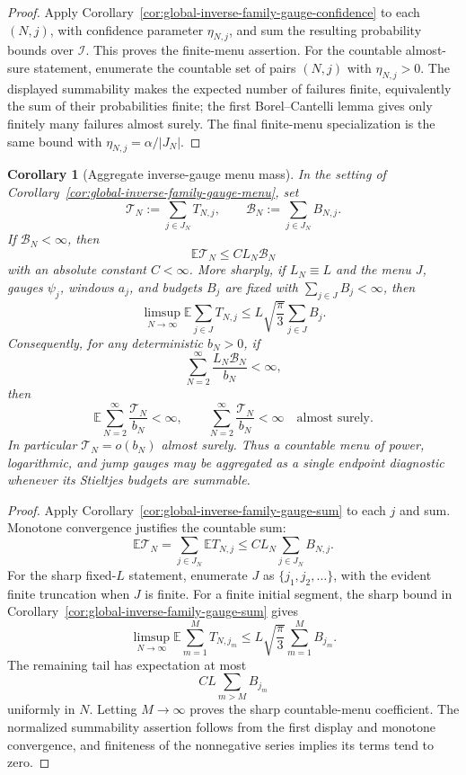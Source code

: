\documentclass[11pt]{amsart}
\numberwithin{equation}{section}
\newtheorem{corollary}[theorem]{Corollary}
\theoremstyle{definition}
\theoremstyle{remark}
\newcommand{\Exp}{\mathbb E}
\begin{document}
\begin{proof}
Apply Corollary~\ref{cor:global-inverse-family-gauge-confidence} to each
\((N,j)\), with confidence parameter \(\eta_{N,j}\), and sum the resulting
probability bounds over \(\mathcal I\).  This proves the finite-menu assertion.
For the countable almost-sure statement, enumerate the countable set of pairs
\((N,j)\) with \(\eta_{N,j}>0\).  The displayed summability makes the expected
number of failures finite, equivalently the sum of their probabilities finite;
the first Borel--Cantelli lemma gives only finitely many failures almost surely.
The final finite-menu specialization is the same bound with
\(\eta_{N,j}=\alpha/|J_N|\).
\end{proof}

\begin{corollary}[Aggregate inverse-gauge menu mass]
\label{cor:global-inverse-family-gauge-menu-sum}
In the setting of Corollary~\ref{cor:global-inverse-family-gauge-menu}, set
\[
  \mathcal T_N:=\sum_{j\in J_N}T_{N,j},
  \qquad
  \mathcal B_N:=\sum_{j\in J_N}B_{N,j}.
\]
If \(\mathcal B_N<\infty\), then
\[
  \Exp \mathcal T_N\le C L_N\mathcal B_N
\]
with an absolute constant \(C<\infty\).  More sharply, if \(L_N\equiv L\) and
the menu \(J\), gauges \(\psi_j\), windows \(a_j\), and budgets \(B_j\) are
fixed with \(\sum_{j\in J}B_j<\infty\), then
\[
  \limsup_{N\to\infty}\Exp\sum_{j\in J}T_{N,j}
  \le
  L\sqrt{\frac{\pi}{3}}\sum_{j\in J}B_j .
\]
Consequently, for any deterministic \(b_N>0\), if
\[
  \sum_{N=2}^\infty \frac{L_N\mathcal B_N}{b_N}<\infty,
\]
then
\[
  \Exp\sum_{N=2}^\infty\frac{\mathcal T_N}{b_N}<\infty,
  \qquad
  \sum_{N=2}^\infty\frac{\mathcal T_N}{b_N}<\infty
  \quad\text{almost surely}.
\]
In particular \(\mathcal T_N=o(b_N)\) almost surely.  Thus a countable menu of
power, logarithmic, and jump gauges may be aggregated as a single endpoint
diagnostic whenever its Stieltjes budgets are summable.
\end{corollary}

\begin{proof}
Apply Corollary~\ref{cor:global-inverse-family-gauge-sum} to each \(j\) and
sum.  Monotone convergence justifies the countable sum:
\[
  \Exp\mathcal T_N
  =
  \sum_{j\in J_N}\Exp T_{N,j}
  \le
  C L_N\sum_{j\in J_N}B_{N,j}.
\]
For the sharp fixed-\(L\) statement, enumerate \(J\) as
\(\{j_1,j_2,\ldots\}\), with the evident finite truncation when \(J\) is finite.
For a finite initial segment, the sharp bound in
Corollary~\ref{cor:global-inverse-family-gauge-sum} gives
\[
  \limsup_{N\to\infty}\Exp\sum_{m=1}^M T_{N,j_m}
  \le
  L\sqrt{\frac{\pi}{3}}\sum_{m=1}^M B_{j_m}.
\]
The remaining tail has expectation at most
\[
  C L\sum_{m>M}B_{j_m}
\]
uniformly in \(N\).  Letting \(M\to\infty\) proves the sharp countable-menu
coefficient.  The normalized summability assertion follows from the first
display and monotone convergence, and finiteness of the nonnegative series
implies its terms tend to zero.
\end{proof}
\end{document}
